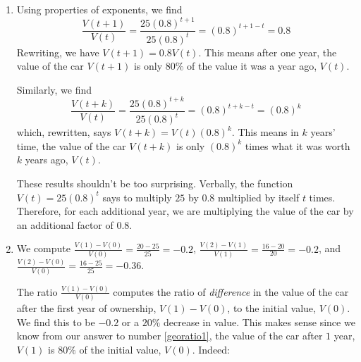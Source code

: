 \documentclass{ximera}
\begin{document}
\begin{example}
\begin{explanation}
\begin{enumerate}
 

Similarly, the ratio $\frac{V(2)}{V(1)} =  0.8$ rewritten as  $V(2) = 0.8 V(1)$ means the value of the car after $2$ years, $V(2)$ is $0.8$ times, or $80 \%$ the value of the car after one year, $V(1)$.


 

Finally, the ratio $\frac{V(2)}{V(0)} = 0.64$, or $V(2) = 0.64 V(0)$ means the value of the car after $2$ years, $V(2)$ is $0.64$ times, or $64 \%$ of the initial value of the car, $V(0)$.  


 

Note that this last result tracks with the previous  answers.  Since $V(1) = 0.8 V(0)$ and $V(2) = 0.8 V(1)$, we get  $V(2) = 0.8 V(1) = 0.8 (0.8 V(0)) = 0.64 V(0)$.  Also note it is no coincidence that the base of the exponential, $0.8$ has shown up in these calculations, as we'll see in the next problem.

\item Using properties of exponents, we find  \[ \frac{V(t+1)}{V(t)} = \frac{25 (0.8)^{t+1}}{25 (0.8)^{t}} = (0.8)^{t+1-t} = 0.8 \] Rewriting, we have  $V(t+1) = 0.8 V(t)$.  This means after one year, the value of the car $V(t+1)$ is only $80 \%$ of the value it was a year ago, $V(t)$.


 

Similarly, we find \[ \frac{V(t+k)}{V(t)} = \frac{25 (0.8)^{t+k}}{25 (0.8)^{t}} = (0.8)^{t+k-t} = (0.8)^{k} \] which, rewritten, says $V(t+k) = V(t) (0.8)^{k}$.  This means in $k$ years' time, the value of the car $V(t+k)$ is only $(0.8)^{k}$ times what it was worth $k$ years ago, $V(t)$.


 

These results shouldn't be too surprising.  Verbally, the function $V(t) = 25 (0.8)^{t}$ says to multiply $25$ by $0.8$ multiplied by itself $t$ times.  Therefore, for each additional year, we are multiplying the value of the car by an additional factor of $0.8$.

\item  We compute  $\frac{V(1) - V(0)}{V(0)} = \frac{20-25}{25} = -0.2$, $\frac{V(2) - V(1)}{V(1)} = \frac{16-20}{20} = -0.2$, and $\frac{V(2) - V(0)}{V(0)} = \frac{16 - 25}{25} = -0.36$.  


 

The ratio  $\frac{V(1) - V(0)}{V(0)}$ computes  the ratio of  \textit{difference} in the value of the car after the first year of ownership,  $V(1) - V(0)$, to the initial value, $V(0)$.  We find this to be $-0.2$ or a $20 \%$ decrease in value.  This makes sense since we know from our answer to number \ref{georatio1}, the value of the car after $1$ year, $V(1)$ is $80 \%$ of the initial value, $V(0)$.  Indeed:


\end{enumerate}
\end{explanation}
\end{example}
\end{document}
